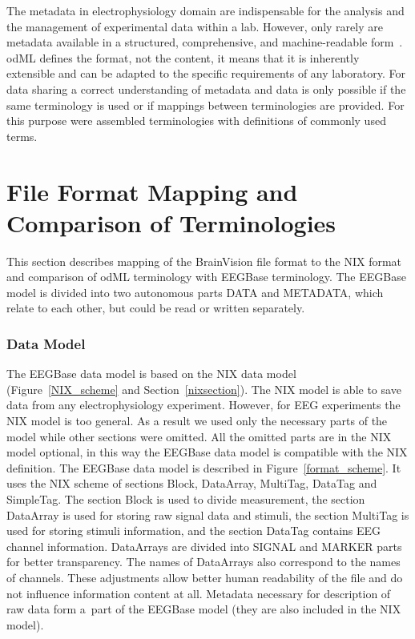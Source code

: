 \documentclass[conference]{IEEEtran}
\begin{document}
The metadata in electrophysiology domain are indispensable for the analysis and the management of experimental data within a lab. However, only rarely are metadata available in a structured, comprehensive, and machine-readable form~\cite{odml}. odML defines the format, not the content, it means that it is inherently extensible and can be adapted to the specific requirements of any laboratory. For data sharing a correct understanding of metadata and data is only possible if the same terminology is used or if mappings between terminologies are provided. For this purpose were assembled terminologies with definitions of commonly used terms.~\cite{odmlarticle}


\section{File Format Mapping and Comparison of Terminologies}

This section describes mapping of the BrainVision file format to the NIX format and comparison of odML terminology with EEGBase terminology. The EEGBase model is divided into two autonomous parts DATA and METADATA, which relate to each other, but could be read or written separately.

\subsubsection{Data Model}
\label{section_data}
The EEGBase data model is based on the NIX data model (Figure~\ref{NIX_scheme} and Section~\ref{nixsection}). The NIX model is able to save data from any electrophysiology experiment. However, for EEG experiments the NIX model is too general. As a result we used only the necessary parts of the model while other sections were omitted. All the omitted parts are in the NIX model optional, in this way the EEGBase data model is compatible with the NIX definition. The EEGBase data model is described in Figure~\ref{format_scheme}. It uses the NIX scheme of sections Block, DataArray, MultiTag, DataTag and SimpleTag. The section Block is used to divide measurement, the section DataArray is used for storing raw signal data and stimuli, the section MultiTag is used for storing stimuli information, and the section DataTag contains EEG channel information. DataArrays are divided into SIGNAL and MARKER parts for better transparency. The names of DataArrays also correspond to the names of channels. These adjustments allow better human readability of the file and do not influence information content at all. Metadata necessary for description of raw data form a~part of the EEGBase model (they are also included in the NIX model).   
\end{document}
